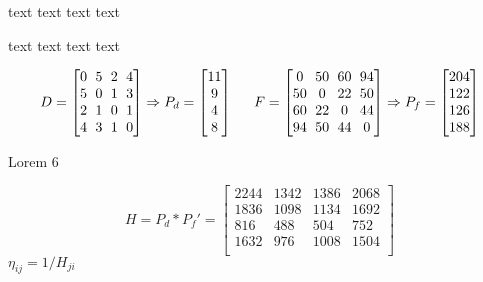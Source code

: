 \documentclass[aspectratio=169]{beamer}
\begin{document}
		\begin{frame}{text text text text}
			\begin{block}{text text text text}
				\begin{ssmall}
					\begin{equation*}
					\label{eq:p_vectors}
					\setlength\arraycolsep{3pt}
					D =
					\begin{bmatrix}
					0 & 5 & 2 & 4 \\
					5 & 0 & 1 & 3 \\
					2 & 1 & 0 & 1 \\
					4 & 3 & 1 & 0 \\
					\end{bmatrix}
					\Rightarrow
					P_{d} =
					\begin{bmatrix}
					11 \\
					9 \\
					4 \\
					8 \\
					\end{bmatrix}
					\hspace{15pt}
					F =
					\begin{bmatrix}
					0 & 50 & 60 & 94  \\
					50 & 0 & 22 & 50  \\
					60 & 22 & 0 & 44  \\
					94 & 50 & 44 & 0  \\
					\end{bmatrix}
					\Rightarrow
					P_{f} =
					\begin{bmatrix}
					204 \\
					122 \\
					126 \\
					188 \\
					\end{bmatrix}
					\end{equation*}
				\end{ssmall}
			\end{block}
			\begin{block}{Lorem 6}
				\centering
				\begin{ssmall}
					\begin{equation*}
					\label{eq:p_matrix}
					H = P_{d} * P_{f}' =
					\begin{bmatrix}
					2244 & 1342 & 1386 & 2068 \\
					1836 & 1098 & 1134 & 1692 \\
					816 &  488 &  504 &  752 \\
					1632 &  976 & 1008 & 1504 \\
					\end{bmatrix}
					\end{equation*}
					\(\eta_{ij} = 1/H_{ji}\)
				\end{ssmall}
			\end{block}
		\end{frame}
\end{document}
